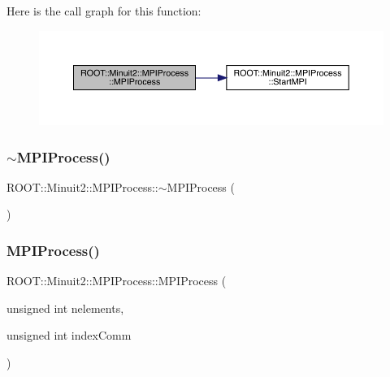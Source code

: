Here is the call graph for this function\+:\nopagebreak
\begin{figure}[H]
\begin{center}
\leavevmode
\includegraphics[width=350pt]{dc/d43/classROOT_1_1Minuit2_1_1MPIProcess_a43d72185b19c2e99f914ff408fd2755b_cgraph}
\end{center}
\end{figure}
\mbox{\label{classROOT_1_1Minuit2_1_1MPIProcess_ac2be6e4b9a721d7f1bf9512580bc113b}} 
\subsubsection{\texorpdfstring{$\sim$MPIProcess()}{~MPIProcess()}\hspace{0.1cm}{\footnotesize\ttfamily [1/3]}}
{\footnotesize\ttfamily R\+O\+O\+T\+::\+Minuit2\+::\+M\+P\+I\+Process\+::$\sim$\+M\+P\+I\+Process (\begin{DoxyParamCaption}{ }\end{DoxyParamCaption})}

\mbox{\label{classROOT_1_1Minuit2_1_1MPIProcess_a43d72185b19c2e99f914ff408fd2755b}} 
\subsubsection{\texorpdfstring{MPIProcess()}{MPIProcess()}\hspace{0.1cm}{\footnotesize\ttfamily [2/3]}}
{\footnotesize\ttfamily R\+O\+O\+T\+::\+Minuit2\+::\+M\+P\+I\+Process\+::\+M\+P\+I\+Process (\begin{DoxyParamCaption}\item[{unsigned int}]{nelements,  }\item[{unsigned int}]{index\+Comm }\end{DoxyParamCaption})}

